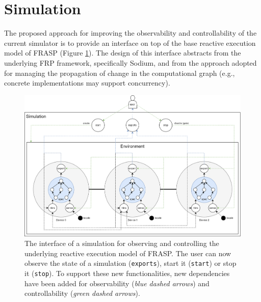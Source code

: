 
\section{Simulation}
\label{section:design:simulation}

The proposed approach for improving the observability and controllability of
the current simulator is to provide an interface on top of the base reactive
execution model of FRASP (Figure \ref{figure:simulation}). The design of this
interface abstracts from the underlying \ac{FRP} framework, specifically
Sodium, and from the approach adopted for managing the propagation of change in
the computational graph (e.g., concrete implementations may support
concurrency).

\begin{figure}[!ht]
  \centering
  \includegraphics[width=1\textwidth]{resources/figures/simulation.png}
  \caption[The interface of a simulation]{
    The interface of a simulation for observing and controlling the
    underlying reactive execution model of FRASP. The user can now observe the
    state of a simulation (\texttt{exports}), start it (\texttt{start}) or stop
    it (\texttt{stop}). To support these new functionalities, new
    dependencies have been added for observability (\textit{blue dashed arrows})
    and controllability (\textit{green dashed arrows}).
  }
  \label{figure:simulation}
\end{figure}

